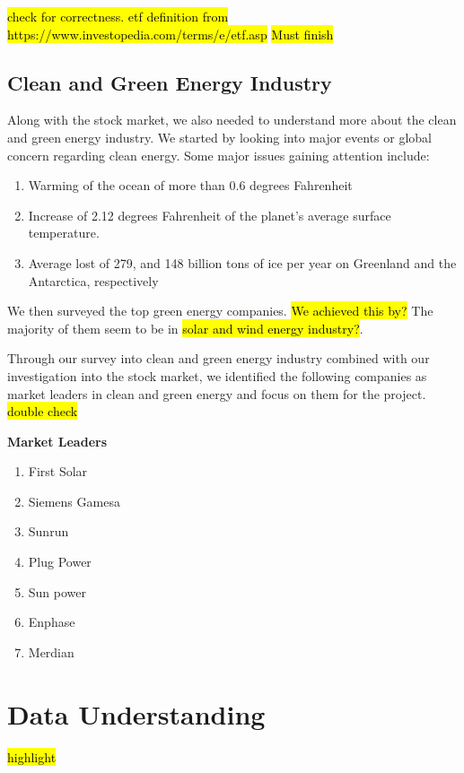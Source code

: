\documentclass[sigconf, nonacm]{acmart}
\begin{document}
\hl{check for correctness. etf definition from https://www.investopedia.com/terms/e/etf.asp}
\hl{Must finish}
\subsection{Clean and Green Energy Industry }
Along with the stock market, we also needed to understand more about the clean and green energy industry. We started by looking into major events or global concern regarding clean energy. Some major issues gaining attention include:
\begin{enumerate}
    \item Warming of the ocean of more than 0.6 degrees Fahrenheit
    \item Increase of 2.12 degrees Fahrenheit of the planet’s average surface temperature.
    \item Average lost of 279, and 148 billion tons of ice per year on Greenland and the Antarctica, respectively
\end{enumerate}

We then surveyed the top green energy companies. \hl{We achieved this by?} The majority of them seem to be in \hl{solar and wind energy industry?}. 

Through our survey into clean and green energy industry combined with our investigation into the stock market, we identified the following companies as market leaders in clean and green energy and focus on them for the project.
\hl{double check}

\textbf{Market Leaders }
\begin{enumerate}
    \item First Solar
    \item Siemens Gamesa
    \item Sunrun
    \item Plug Power
    \item Sun power 
    \item Enphase 
    \item Merdian 
\end{enumerate}





\section{Data Understanding}
\hl{highlight}
\end{document}
